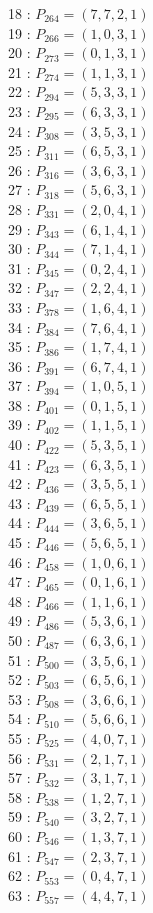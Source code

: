 \documentclass{article}
\begin{document}
{\begin{multicols}{2}
18 : $P_{264}=( 7, 7, 2, 1 )$\\
19 : $P_{266}=( 1, 0, 3, 1 )$\\
20 : $P_{273}=( 0, 1, 3, 1 )$\\
21 : $P_{274}=( 1, 1, 3, 1 )$\\
22 : $P_{294}=( 5, 3, 3, 1 )$\\
23 : $P_{295}=( 6, 3, 3, 1 )$\\
24 : $P_{308}=( 3, 5, 3, 1 )$\\
25 : $P_{311}=( 6, 5, 3, 1 )$\\
26 : $P_{316}=( 3, 6, 3, 1 )$\\
27 : $P_{318}=( 5, 6, 3, 1 )$\\
28 : $P_{331}=( 2, 0, 4, 1 )$\\
29 : $P_{343}=( 6, 1, 4, 1 )$\\
30 : $P_{344}=( 7, 1, 4, 1 )$\\
31 : $P_{345}=( 0, 2, 4, 1 )$\\
32 : $P_{347}=( 2, 2, 4, 1 )$\\
33 : $P_{378}=( 1, 6, 4, 1 )$\\
34 : $P_{384}=( 7, 6, 4, 1 )$\\
35 : $P_{386}=( 1, 7, 4, 1 )$\\
36 : $P_{391}=( 6, 7, 4, 1 )$\\
37 : $P_{394}=( 1, 0, 5, 1 )$\\
38 : $P_{401}=( 0, 1, 5, 1 )$\\
39 : $P_{402}=( 1, 1, 5, 1 )$\\
40 : $P_{422}=( 5, 3, 5, 1 )$\\
41 : $P_{423}=( 6, 3, 5, 1 )$\\
42 : $P_{436}=( 3, 5, 5, 1 )$\\
43 : $P_{439}=( 6, 5, 5, 1 )$\\
44 : $P_{444}=( 3, 6, 5, 1 )$\\
45 : $P_{446}=( 5, 6, 5, 1 )$\\
46 : $P_{458}=( 1, 0, 6, 1 )$\\
47 : $P_{465}=( 0, 1, 6, 1 )$\\
48 : $P_{466}=( 1, 1, 6, 1 )$\\
49 : $P_{486}=( 5, 3, 6, 1 )$\\
50 : $P_{487}=( 6, 3, 6, 1 )$\\
51 : $P_{500}=( 3, 5, 6, 1 )$\\
52 : $P_{503}=( 6, 5, 6, 1 )$\\
53 : $P_{508}=( 3, 6, 6, 1 )$\\
54 : $P_{510}=( 5, 6, 6, 1 )$\\
55 : $P_{525}=( 4, 0, 7, 1 )$\\
56 : $P_{531}=( 2, 1, 7, 1 )$\\
57 : $P_{532}=( 3, 1, 7, 1 )$\\
58 : $P_{538}=( 1, 2, 7, 1 )$\\
59 : $P_{540}=( 3, 2, 7, 1 )$\\
60 : $P_{546}=( 1, 3, 7, 1 )$\\
61 : $P_{547}=( 2, 3, 7, 1 )$\\
62 : $P_{553}=( 0, 4, 7, 1 )$\\
63 : $P_{557}=( 4, 4, 7, 1 )$\\
\end{multicols}
}
\end{document}
